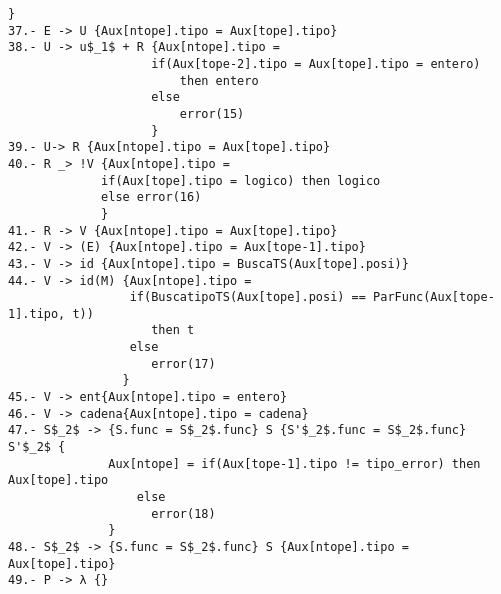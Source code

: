 \documentclass[a4paper, 12pt]{article}
\begin{document}
\begin{lstlisting}[style=EstadosAutomataST]
                    }
37.- E -> U {Aux[ntope].tipo = Aux[tope].tipo}
38.- U -> u$_1$ + R {Aux[ntope].tipo =
                    if(Aux[tope-2].tipo = Aux[tope].tipo = entero)
                        then entero
                    else
                        error(15)
                    }
39.- U-> R {Aux[ntope].tipo = Aux[tope].tipo}
40.- R _> !V {Aux[ntope].tipo =
             if(Aux[tope].tipo = logico) then logico
             else error(16)
             }
41.- R -> V {Aux[ntope].tipo = Aux[tope].tipo}
42.- V -> (E) {Aux[ntope].tipo = Aux[tope-1].tipo}
43.- V -> id {Aux[ntope].tipo = BuscaTS(Aux[tope].posi)}
44.- V -> id(M) {Aux[ntope].tipo =
                 if(BuscatipoTS(Aux[tope].posi) == ParFunc(Aux[tope-1].tipo, t))
                    then t
                 else
                    error(17)
                }
45.- V -> ent{Aux[ntope].tipo = entero}
46.- V -> cadena{Aux[ntope].tipo = cadena}
47.- S$_2$ -> {S.func = S$_2$.func} S {S'$_2$.func = S$_2$.func} S'$_2$ {
              Aux[ntope] = if(Aux[tope-1].tipo != tipo_error) then Aux[tope].tipo
                  else
                    error(18)
              }
48.- S$_2$ -> {S.func = S$_2$.func} S {Aux[ntope].tipo = Aux[tope].tipo}
49.- P -> λ {}

\end{lstlisting}
\end{document}
